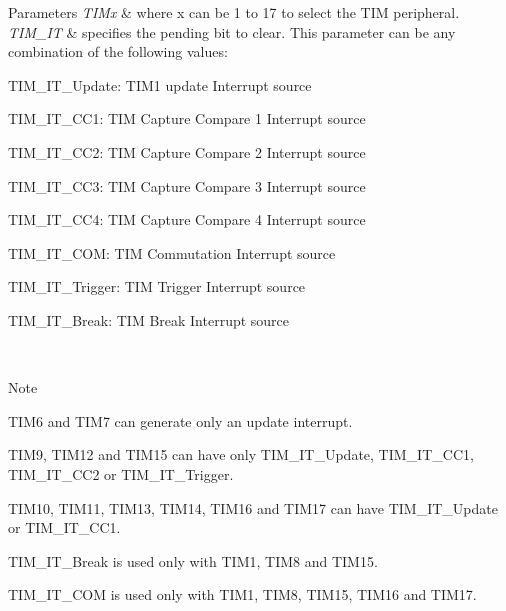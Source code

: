 \begin{DoxyParams}{Parameters}
{\em T\+I\+Mx} & where x can be 1 to 17 to select the T\+IM peripheral. \\
\hline
{\em T\+I\+M\+\_\+\+IT} & specifies the pending bit to clear. This parameter can be any combination of the following values\+: \begin{DoxyItemize}
\item T\+I\+M\+\_\+\+I\+T\+\_\+\+Update\+: T\+I\+M1 update Interrupt source \item T\+I\+M\+\_\+\+I\+T\+\_\+\+C\+C1\+: T\+IM Capture Compare 1 Interrupt source \item T\+I\+M\+\_\+\+I\+T\+\_\+\+C\+C2\+: T\+IM Capture Compare 2 Interrupt source \item T\+I\+M\+\_\+\+I\+T\+\_\+\+C\+C3\+: T\+IM Capture Compare 3 Interrupt source \item T\+I\+M\+\_\+\+I\+T\+\_\+\+C\+C4\+: T\+IM Capture Compare 4 Interrupt source \item T\+I\+M\+\_\+\+I\+T\+\_\+\+C\+OM\+: T\+IM Commutation Interrupt source \item T\+I\+M\+\_\+\+I\+T\+\_\+\+Trigger\+: T\+IM Trigger Interrupt source \item T\+I\+M\+\_\+\+I\+T\+\_\+\+Break\+: T\+IM Break Interrupt source \end{DoxyItemize}
\\
\hline
\end{DoxyParams}
\begin{DoxyNote}{Note}

\begin{DoxyItemize}
\item T\+I\+M6 and T\+I\+M7 can generate only an update interrupt.
\item T\+I\+M9, T\+I\+M12 and T\+I\+M15 can have only T\+I\+M\+\_\+\+I\+T\+\_\+\+Update, T\+I\+M\+\_\+\+I\+T\+\_\+\+C\+C1, T\+I\+M\+\_\+\+I\+T\+\_\+\+C\+C2 or T\+I\+M\+\_\+\+I\+T\+\_\+\+Trigger.
\item T\+I\+M10, T\+I\+M11, T\+I\+M13, T\+I\+M14, T\+I\+M16 and T\+I\+M17 can have T\+I\+M\+\_\+\+I\+T\+\_\+\+Update or T\+I\+M\+\_\+\+I\+T\+\_\+\+C\+C1.
\item T\+I\+M\+\_\+\+I\+T\+\_\+\+Break is used only with T\+I\+M1, T\+I\+M8 and T\+I\+M15.
\item T\+I\+M\+\_\+\+I\+T\+\_\+\+C\+OM is used only with T\+I\+M1, T\+I\+M8, T\+I\+M15, T\+I\+M16 and T\+I\+M17.
\end{DoxyItemize}
\end{DoxyNote}

